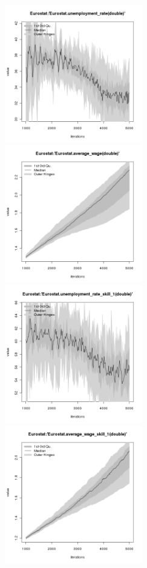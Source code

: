 \begin{figure}[H!]
\centering\leavevmode
\begin{minipage}{14cm}
\centering\leavevmode
\includegraphics[width=6cm]{./png/tax_0.10/Eurostat-unemployment_rate.png}
\includegraphics[width=6cm]{./png/tax_0.10/Eurostat-average_wage.png}\\
\includegraphics[width=6cm]{./png/tax_0.10/Eurostat-unemployment_rate_skill_1.png}
\includegraphics[width=6cm]{./png/tax_0.10/Eurostat-average_wage_skill_1.png}\\

\end{minipage}
\end{figure}
